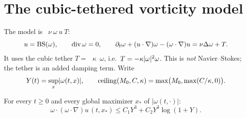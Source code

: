 \documentclass[11pt]{article}
\begin{document}
\section{The cubic-tethered vorticity model}
The model is ~$\nu\ \omega\ u\ T$:
\begin{equation}\label{eq:model}u=\mathrm{BS}(\omega),\qquad \operatorname{div}\omega=0,\qquad \partial_t\omega+(u\cdot\nabla)\omega-(\omega\cdot\nabla)u=\nu\Delta\omega+T.\end{equation}
It uses the cubic tether $T=$\,~$\kappa$~$\omega$, i.e.\ $T=-\kappa\lvert\omega\rvert^2\omega$. This is \emph{not} Navier--Stokes; the tether is an added damping term. Write
\[Y(t)=\sup_x\lvert\omega(t,x)\rvert,\qquad \mathrm{ceiling}(M_0,C,\kappa)=\max\bigl(M_0,\max(C/\kappa,0)\bigr).\]

\begin{hyp}
For every $t\ge0$ and every global maximizer $x_*$ of $|\omega(t,\cdot)|$:
\begin{equation}\label{eq:logloss}\omega\cdot(\omega\cdot\nabla)u\,(t,x_*)\le C_1Y^3+C_2Y^3\log(1+Y).\end{equation}
\end{hyp}
\end{document}
